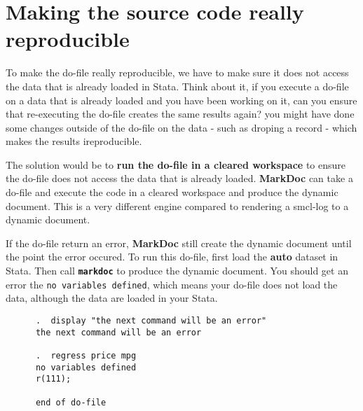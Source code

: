 \documentclass{article}
\begin{document}
\section{Making the source code really
reproducible}\label{making-the-source-code-really-reproducible}

To make the do-file really reproducible, we have to make sure it does
not access the data that is already loaded in Stata. Think about it, if
you execute a do-file on a data that is already loaded and you have been
working on it, can you ensure that re-executing the do-file creates the
same results again? you might have done some changes outside of the
do-file on the data - such as droping a record - which makes the results
ireproducible.

The solution would be to \textbf{run the do-file in a cleared workspace}
to ensure the do-file does not access the data that is already loaded.
\textbf{MarkDoc} can take a do-file and execute the code in a cleared
workspace and produce the dynamic document. This is a very different
engine compared to rendering a smcl-log to a dynamic document.

If the do-file return an error, \textbf{MarkDoc} still create the
dynamic document until the point the error occured. To run this do-file,
first load the \textbf{auto} dataset in Stata. Then call
\textbf{\texttt{markdoc}} to produce the dynamic document. You should
get an error the \texttt{no\ variables\ defined}, which means your
do-file does not load the data, although the data are loaded in your
Stata.

\begin{verbatim}
      .  display "the next command will be an error"
      the next command will be an error
      
      .  regress price mpg
      no variables defined
      r(111);
      
      end of do-file
      
\end{verbatim}
\end{document}
